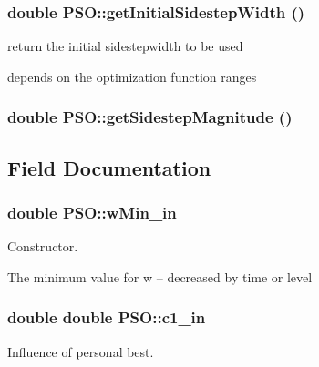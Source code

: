 \hypertarget{classPSO_eb56dd8010afe48a363ed5aa7b4cece5}{
\subsubsection{\setlength{\rightskip}{0pt plus 5cm}double PSO::getInitialSidestepWidth ()}}
\label{classPSO_eb56dd8010afe48a363ed5aa7b4cece5}


return the initial sidestepwidth to be used 

depends on the optimization function ranges \hypertarget{classPSO_e10c3d066b7d204d10698dc7c2e9305f}{
\subsubsection{\setlength{\rightskip}{0pt plus 5cm}double PSO::getSidestepMagnitude ()}}
\label{classPSO_e10c3d066b7d204d10698dc7c2e9305f}




\subsection{Field Documentation}
\hypertarget{classPSO_630f0b982a4dbf3c8c50baad37eb8400}{
\subsubsection{\setlength{\rightskip}{0pt plus 5cm}double {\bf PSO::wMin\_\-in}}}
\label{classPSO_630f0b982a4dbf3c8c50baad37eb8400}


Constructor. 

The minimum value for w -- decreased by time or level \hypertarget{classPSO_c6d05fd6f3829bf14bdce996450fa588}{
\subsubsection{\setlength{\rightskip}{0pt plus 5cm}double double {\bf PSO::c1\_\-in}}}
\label{classPSO_c6d05fd6f3829bf14bdce996450fa588}


Influence of personal best. 

